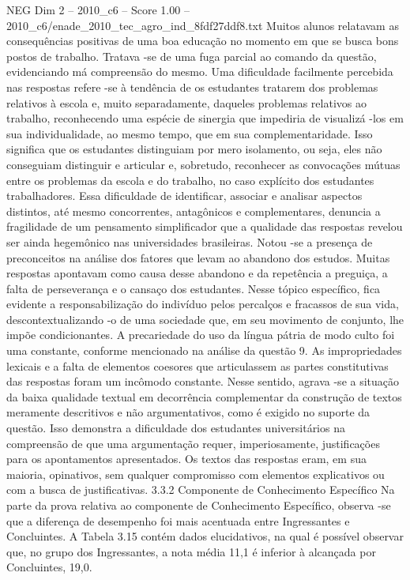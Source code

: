 \begin{textsample}{NEG Dim 2 – 2010\_c6 – Score 1.00 – 2010\_c6/enade\_2010\_tec\_agro\_ind\_8fdf27ddf8.txt}
Muitos alunos relatavam as consequências positivas de uma boa educação no momento em que se busca bons postos de trabalho.
Tratava -se de uma fuga parcial ao comando da questão, evidenciando má compreensão do mesmo.
Uma dificuldade facilmente percebida nas respostas refere -se à tendência de os estudantes tratarem dos problemas relativos à escola e, muito separadamente, daqueles problemas relativos ao trabalho, reconhecendo uma espécie de sinergia que impediria de visualizá -los em sua individualidade, ao mesmo tempo, que em sua complementaridade.
Isso significa que os estudantes distinguiam por mero isolamento, ou seja, eles não conseguiam distinguir e articular e, sobretudo, reconhecer as convocações mútuas entre os problemas da escola e do trabalho, no caso explícito dos estudantes trabalhadores.
Essa dificuldade de identificar, associar e analisar aspectos distintos, até mesmo concorrentes, antagônicos e complementares, denuncia a fragilidade de um pensamento simplificador que a qualidade das respostas revelou ser ainda hegemônico nas universidades brasileiras.
Notou -se a presença de preconceitos na análise dos fatores que levam ao abandono dos estudos.
Muitas respostas apontavam como causa desse abandono e da repetência a preguiça, a falta de perseverança e o cansaço dos estudantes.
Nesse tópico específico, fica evidente a responsabilização do indivíduo pelos percalços e fracassos de sua vida, descontextualizando -o de uma sociedade que, em seu movimento de conjunto, lhe impõe condicionantes.
A precariedade do uso da língua pátria de modo culto foi uma constante, conforme mencionado na análise da questão 9.
As impropriedades lexicais e a falta de elementos coesores que articulassem as partes constitutivas das respostas foram um incômodo constante.
Nesse sentido, agrava -se a situação da baixa qualidade textual em decorrência complementar da construção de textos meramente descritivos e não argumentativos, como é exigido no suporte da questão.
Isso demonstra a dificuldade dos estudantes universitários na compreensão de que uma argumentação requer, imperiosamente, justificações para os apontamentos apresentados.
Os textos das respostas eram, em sua maioria, opinativos, sem qualquer compromisso com elementos explicativos ou com a busca de justificativas. 3.3.2 Componente de Conhecimento Específico Na parte da prova relativa ao componente de Conhecimento Específico, observa -se que a diferença de desempenho foi mais acentuada entre Ingressantes e Concluintes.
A Tabela 3.15 contém dados elucidativos, na qual é possível observar que, no grupo dos Ingressantes, a nota média 11,1 é inferior à alcançada por Concluintes, 19,0.

\end{textsample}
